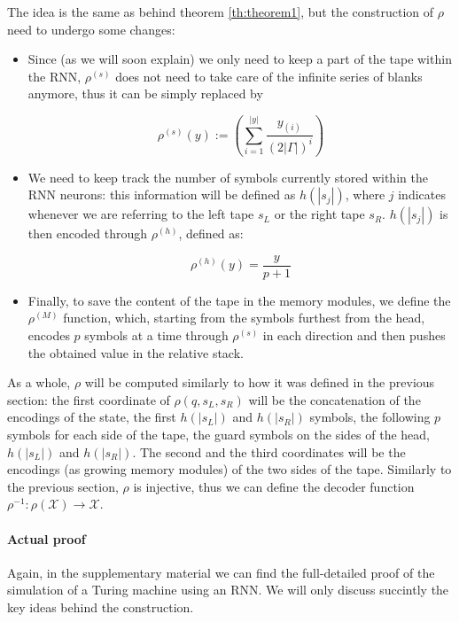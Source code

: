 \documentclass{article}
\begin{document}
The idea is the same as behind theorem \ref{th:theorem1}, but the construction of $\rho$ need to undergo some changes:
\begin{itemize}
    \item Since (as we will soon explain) we only need to keep a part of the tape within the RNN, $\rho^{(s)}$ does not need to take care of the infinite series of blanks anymore, thus it can be simply replaced by

    \begin{equation}\label{eq:fractalNoBlanks}
        \rho^{(s)}(y) := \left(\sum_{i=1}^{|y|} \frac{y_{(i)}}{{(2|\Gamma|)^i}}\right)
    \end{equation}

    \item We need to keep track the number of symbols currently stored within the RNN neurons: this information will be defined as $h(|s_j|)$, where $j$ indicates whenever we are referring to the left tape $s_L$ or the right tape $s_R$. $h(|s_j|)$ is then encoded through $\rho^{(h)}$, defined as:

    \begin{equation}
        \rho^{(h)}(y) = \frac{y}{p+1}
    \end{equation}
    
    \item Finally, to save the content of the tape in the memory modules, we define the $\rho^{(M)}$ function, which, starting from the symbols furthest from the head, encodes $p$ symbols at a time through $\rho^{(s)}$ in each direction and then pushes the obtained value in the relative stack.
\end{itemize}

As a whole, $\rho$ will be computed similarly to how it was defined in the previous section: the first coordinate of $\rho(q,s_L,s_R)$ will be the concatenation of the encodings of the state, the first $h(|s_L|)$ and $h(|s_R|)$ symbols, the following $p$ symbols for each side of the tape, the guard symbols on the sides of the head, $h(|s_L|)$ and $h(|s_R|)$. The second and the third coordinates will be the encodings (as growing memory modules) of the two sides of the tape.
Similarly to the previous section, $\rho$ is injective, thus we can define the decoder function $\rho^{-1}:\rho(\mathcal{X}) \rightarrow \mathcal{X}$.

\paragraph{Actual proof}
Again, in the supplementary material we can find the full-detailed proof of the simulation of a Turing machine using an RNN. We will only discuss succintly the key ideas behind the construction.
\end{document}
